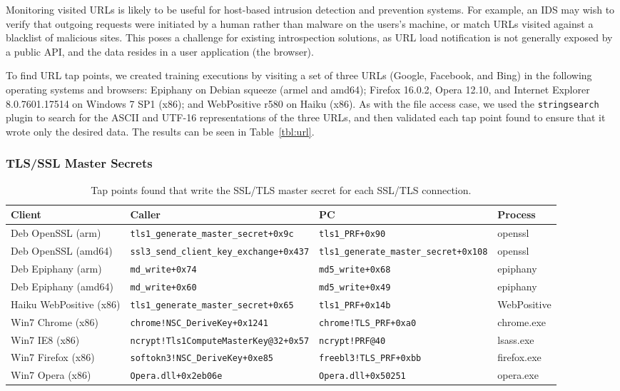Monitoring visited URLs is likely to be useful for host-based intrusion
detection and prevention systems. For example, an IDS may wish to verify
that outgoing requests were initiated by a human rather than malware on
the users's machine, or match URLs visited against a blacklist of
malicious sites. This poses a challenge for existing introspection
solutions, as URL load notification is not generally exposed by a public
API, and the data resides in a user application (the browser).

To find URL tap points, we created training executions by visiting a set
of three URLs (Google, Facebook, and Bing) in the following operating
systems and browsers: Epiphany on Debian squeeze (armel and amd64);
Firefox 16.0.2, Opera 12.10, and Internet Explorer 8.0.7601.17514 on
Windows 7 SP1 (x86); and WebPositive r580 on Haiku (x86). As with the
file access case, we used the \texttt{stringsearch} plugin to search for
the ASCII and UTF-16 representations of the three URLs, and then
validated each tap point found to ensure that it wrote only the desired
data. The results can be seen in Table~\ref{tbl:url}.

\subsubsection{TLS/SSL Master Secrets}
\label{sec:eval:subsec:ssl}

\begin{table*}
    \centering
    \small
    \begin{tabular}{|l|l|l|l|}
        \hline
        Client & Caller & PC & Process \\
        \hline
        Deb OpenSSL (arm) & \texttt{tls1\_generate\_master\_secret+0x9c} & \texttt{tls1\_PRF+0x90} & openssl \\
        Deb OpenSSL (amd64) & \texttt{ssl3\_send\_client\_key\_exchange+0x437} & \texttt{tls1\_generate\_master\_secret+0x108} & openssl \\
        Deb Epiphany (arm) & \texttt{md\_write+0x74} & \texttt{md5\_write+0x68} & epiphany \\ 
        Deb Epiphany (amd64) & \texttt{md\_write+0x60} & \texttt{md5\_write+0x49} & epiphany \\ 
        Haiku WebPositive (x86) & \texttt{tls1\_generate\_master\_secret+0x65} & \texttt{tls1\_PRF+0x14b} & WebPositive \\
        Win7 Chrome (x86) & \texttt{chrome!NSC\_DeriveKey+0x1241} & \texttt{chrome!TLS\_PRF+0xa0} & chrome.exe \\
        Win7 IE8 (x86) & \texttt{ncrypt!Tls1ComputeMasterKey@32+0x57} & \texttt{ncrypt!PRF@40} & lsass.exe \\
        Win7 Firefox (x86) & \texttt{softokn3!NSC\_DeriveKey+0xe85} & \texttt{freebl3!TLS\_PRF+0xbb} & firefox.exe \\
        Win7 Opera (x86) & \texttt{Opera.dll+0x2eb06e} & \texttt{Opera.dll+0x50251} & opera.exe \\
        \hline
    \end{tabular}
\caption{Tap points found that write the SSL/TLS master secret for each
SSL/TLS connection.}
\label{tbl:ssl}
\end{table*}

